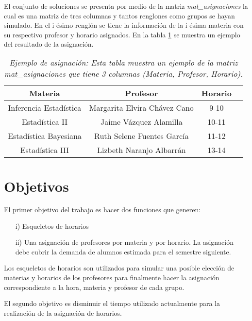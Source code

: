 El conjunto de soluciones se presenta por medio de la matriz \textit{mat\_asignaciones} la cual es una matriz de tres columnas y tantos renglones como grupos se hayan simulado. En el i-ésimo renglón se tiene la información de la i-ésima materia con su respectivo profesor y horario asignados. En la tabla \ref{EjAsig} se muestra un ejemplo del resultado de la asignación.

\begin{table}[H]
\centering
\begin{tabular}{|c|c|c|c|}
\hline 
\textbf{Materia} & \textbf{Profesor} & \textbf{Horario} \\ 
\hline 
Inferencia Estadística & Margarita Elvira Chávez Cano & 9-10 \\ 
\hline 
Estadística II & Jaime Vázquez Alamilla & 10-11 \\ 
\hline 
Estadística Bayesiana  & Ruth Selene Fuentes García & 11-12 \\ 
\hline 
Estadística III  & Lizbeth Naranjo Albarrán & 13-14 \\ 
\hline 
\end{tabular}  
\caption[\textit{Ejemplo de asignación}]{\textit{Ejemplo de asignación: Esta tabla muestra un ejemplo de la matriz mat\_asignaciones que tiene 3 columnas (Materia, Profesor, Horario).}}\label{EjAsig}
\end{table}


\section{Objetivos}

El primer objetivo del trabajo es hacer dos funciones que generen:
  
  \begin{enumerate}
\item[i)] Esqueletos de horarios

\item[ii)] Una asignación de profesores por materia y por horario. La asignación debe cubrir la demanda de alumnos estimada para el semestre siguiente.
\end{enumerate}


Los esqueletos de horarios son utilizados para simular una posible elección de materias y horarios de los profesores para finalmente hacer la asignación correspondiente a la hora, materia y profesor de cada grupo.

El segundo objetivo es disminuir el tiempo utilizado actualmente para la realización de la asignación de horarios.


